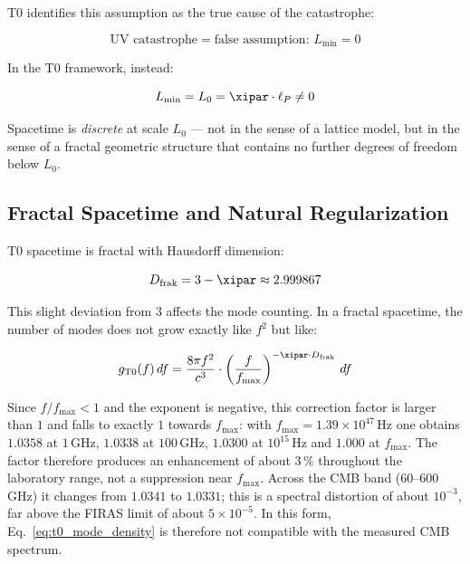 T0 identifies this assumption as the true cause of the catastrophe:

\begin{equation}
    \text{UV catastrophe} = \text{false assumption: } L_{\min} = 0
\end{equation}

In the T0 framework, instead:

\begin{equation}
    L_{\min} = L_0 = \xipar \cdot \ell_P \neq 0
\end{equation}

Spacetime is \emph{discrete} at scale $L_0$ — not in the sense of a lattice model, 
but in the sense of a fractal geometric structure that contains no further degrees 
of freedom below $L_0$.

\subsection{Fractal Spacetime and Natural Regularization}

T0 spacetime is fractal with Hausdorff dimension:

\begin{equation}
    D_{\text{frak}} = 3 - \xipar \approx 2.999867
    \label{eq:fractal_dim}
\end{equation}

This slight deviation from 3 affects the mode counting. In a fractal spacetime, 
the number of modes does not grow exactly like $f^2$ but like:

\begin{equation}
    g_{\text{T0}}(f) \, df = \frac{8\pi f^2}{c^3} \cdot \left(\frac{f}{f_{\max}}\right)^{-\xipar \cdot D_{\text{frak}}} \, df
    \label{eq:t0_mode_density}
\end{equation}

Since $f/f_{\max} < 1$ and the exponent is negative, this correction factor is larger 
than $1$ and falls to exactly $1$ towards $f_{\max}$: with $f_{\max} = 1.39\times10^{47}$\,Hz 
one obtains $1.0358$ at $1$\,GHz, $1.0338$ at $100$\,GHz, $1.0300$ at $10^{15}$\,Hz and 
$1.000$ at $f_{\max}$. The factor therefore produces an enhancement of about $3\,\%$ 
throughout the laboratory range, not a suppression near $f_{\max}$. Across the CMB band 
($60$--$600$\,GHz) it changes from $1.0341$ to $1.0331$; this is a spectral distortion of 
about $10^{-3}$, far above the FIRAS limit of about $5\times10^{-5}$. In this form, 
Eq.~\eqref{eq:t0_mode_density} is therefore not compatible with the measured CMB spectrum.

